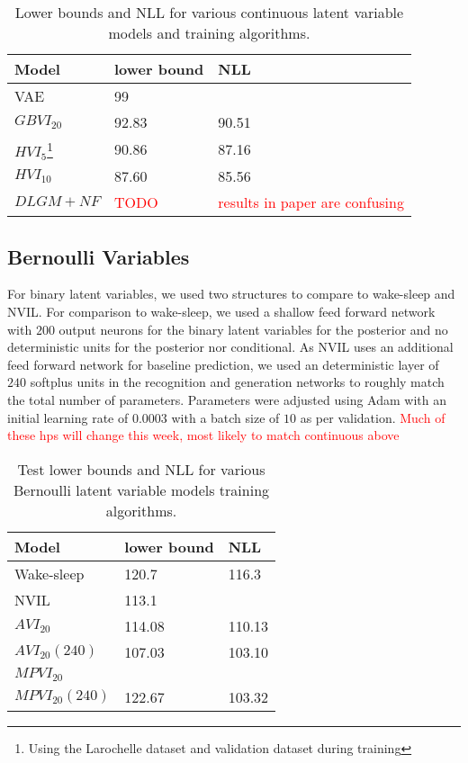 \documentclass{article} %
\newcommand{\alert}[1]{\textcolor{red}{#1}}
\begin{document}
\begin{table}
\label{table:continuous}
\begin{tabular}{ | m{5em} | m{1cm}| m{5cm} | } 
\hline
Model & lower bound & NLL \\ 
\hline
\hline
VAE & 99 &  \\ 
\hline
$GBVI_{20}$ & 92.83 & 90.51 \\ 
\hline
\hline
$HVI_5$\footnote[1]{Using the Larochelle dataset and validation dataset during training} &  90.86 & 87.16 \\ 
$HVI_{10}$\footnote[1] & 87.60 & 85.56 \\ 
$DLGM+NF$ & \alert{TODO} & \alert{results in paper are confusing} \\
\hline
\end{tabular}
\caption{Lower bounds and NLL for various continuous latent variable models and training algorithms.}
\end{table}

\subsection{Bernoulli Variables}
For binary latent variables, we used two structures to compare to wake-sleep and NVIL. For comparison to wake-sleep, we used a shallow feed forward network with $200$ output neurons for the binary latent variables for the posterior and no deterministic units for the posterior nor conditional. As NVIL uses an additional feed forward network for baseline prediction, we used an deterministic layer of $240$ softplus units in the recognition and generation networks to roughly match the total number of parameters. Parameters were adjusted using Adam \citep{kingma2014method} with an initial learning rate of \num{0.0003} with a batch size of $10$ as per validation. \alert{Much of these hps will change this week, most likely to match continuous above}

\begin{table}
\label{table:binary}
\begin{tabular}{ | m{6em} | m{1cm}| m{1cm} | } 
\hline
Model & lower bound & NLL \\ 
\hline
\hline
Wake-sleep & 120.7 & 116.3 \\ 
\hline
NVIL & 113.1 &  \\ 
\hline
$AVI_{20}$ & 114.08 & 110.13 \\
$AVI_{20}(240)$ & 107.03 & 103.10 \\
\hline
$MPVI_{20}$ &  &  \\
$MPVI_{20}(240)$ & 122.67  & 103.32 \\
\hline
\end{tabular}
\caption{Test lower bounds and NLL for various Bernoulli latent variable models training algorithms.}
\end{table}
\end{document}
